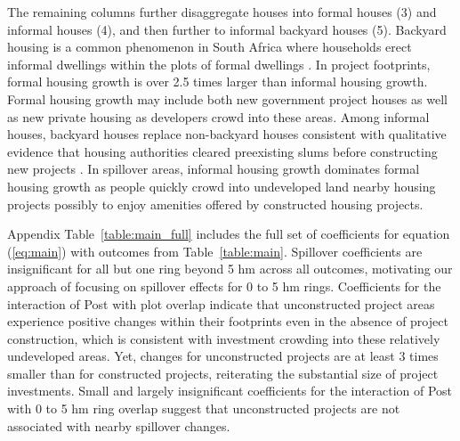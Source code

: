 \documentclass[12pt]{article}
\begin{document}
The remaining columns further disaggregate houses into formal houses (3) and informal houses (4), and then further to informal backyard houses (5).  Backyard housing is a common phenomenon in South Africa where households erect informal dwellings within the plots of formal dwellings \citep{Brueckner2018backyarding}.  In project footprints, formal housing growth is over 2.5 times larger than informal housing growth.  Formal housing growth may include both new government project houses as well as new private housing as developers crowd into these areas.  Among informal houses, backyard houses replace non-backyard houses consistent with qualitative evidence that housing authorities cleared preexisting slums before constructing new projects \citep{hofmeyr2008risk}.  In spillover areas, informal housing growth dominates formal housing growth as people quickly crowd into undeveloped land nearby housing projects possibly to enjoy amenities offered by constructed housing projects.

Appendix Table~\ref{table:main_full} includes the full set of coefficients for equation (\ref{eq:main}) with outcomes from  Table~\ref{table:main}.  Spillover coefficients are insignificant for all but one ring beyond 5 hm across all outcomes, motivating our approach of focusing on spillover effects for 0 to 5 hm rings.  Coefficients for the interaction of Post with plot overlap indicate that unconstructed project areas experience positive changes within their footprints even in the absence of project construction, which is consistent with investment crowding into these relatively undeveloped areas.  Yet, changes for unconstructed projects are at least 3 times smaller than for constructed projects, reiterating the substantial size of project investments.  Small and largely insignificant coefficients for the interaction of Post with 0 to 5 hm ring overlap suggest that unconstructed projects are not associated with nearby spillover changes.  
\end{document}
